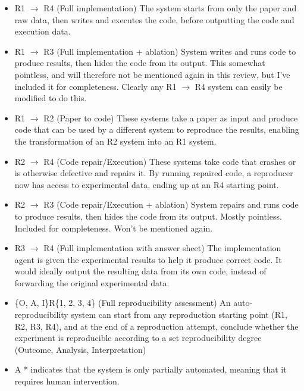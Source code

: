\documentclass[8pt,a4paper]{article}
\begin{document}
\begin{itemize}\label{itm:classification}
    \item R1 $\rightarrow$ R4 (Full implementation)
        \subitem The system starts from only the paper and raw data, then writes and executes the code, before outputting the code and execution data.
    \item R1 $\rightarrow$ R3 (Full implementation + ablation)
        \subitem System writes and runs code to produce results, then hides the code from its output.
        This somewhat pointless, and will therefore not be mentioned again in this review, but I've included it for completeness.
        Clearly any R1 $\rightarrow$ R4 system can easily be modified to do this.
    \item R1 $\rightarrow$ R2 (Paper to code)
        \subitem These systems take a paper as input and produce code that can be used by a different system to reproduce the results, 
        enabling the transformation of an R2 system into an R1 system.
    \item R2 $\rightarrow$ R4 (Code repair/Execution)
        \subitem These systems take code that crashes or is otherwise defective and repairs it. 
        By running repaired code, a reproducer now has access to experimental data, ending up at an R4 starting point.
    \item R2 $\rightarrow$ R3 (Code repair/Execution + ablation)
        \subitem System repairs and runs code to produce results, then hides the code from its output.
        Mostly pointless. Included for completeness. Won't be mentioned again.
    \item R3 $\rightarrow$ R4 (Full implementation with answer sheet)
        \subitem The implementation agent is given the experimental results to help it produce correct code. 
        It would ideally output the resulting data from its own code, instead of forwarding the original experimental data.
    \item \{O, A, I\}R\{1, 2, 3, 4\} (Full reproducibility assessment)
        \subitem An auto-reproducibility system can start from any reproduction starting point (R1, R2, R3, R4), 
        and at the end of a reproduction attempt, conclude whether the experiment is reproducible 
        according to a set reproducibility degree (Outcome, Analysis, Interpretation)
    \item A * indicates that the system is only partially automated, meaning that it requires human intervention.
\end{itemize}
\end{document}
